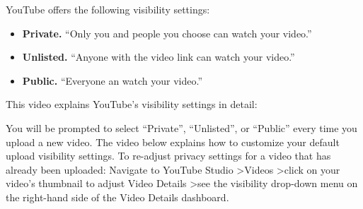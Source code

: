 \begin{gram}
YouTube offers the following visibility settings:

\begin{itemize}
        \item \textbf{Private.} ``Only you and people you choose can watch your video.''
        \item \textbf{Unlisted.} ``Anyone with the video link can watch your video.''
        \item \textbf{Public.} ``Everyone an watch your video.''
    \end{itemize}

This video explains YouTube's visibility settings in detail:

\end{gram}

\begin{gram}
    You will be prompted to select ``Private'', ``Unlisted'', or ``Public'' every time you upload a new video.
    The video below explains how to customize your default upload visibility settings.
    To re-adjust privacy settings for a video that has already been uploaded: Navigate to YouTube Studio \textgreater Videos \textgreater click on your video's thumbnail to adjust Video Details \textgreater see the visibility drop-down menu on the right-hand side of the Video Details dashboard.

\end{gram}

